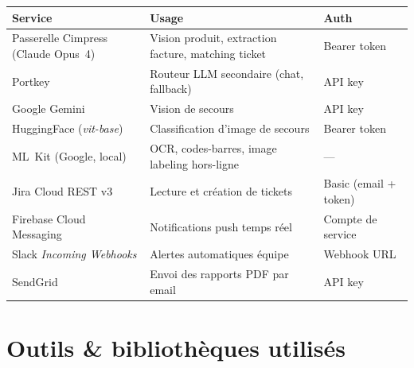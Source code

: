\documentclass[11pt,a4paper]{article}
\begin{document}
\begin{center}
\begin{tabularx}{\linewidth}{@{}lXl@{}}
\toprule
\textbf{Service} & \textbf{Usage} & \textbf{Auth}\\
\midrule
Passerelle Cimpress (Claude Opus~4) & Vision produit, extraction facture, matching ticket & Bearer token \\
Portkey                             & Routeur LLM secondaire (chat, fallback) & API key \\
Google Gemini                       & Vision de secours & API key \\
HuggingFace (\emph{vit-base})       & Classification d'image de secours & Bearer token \\
ML~Kit (Google, local)              & OCR, codes-barres, image labeling hors-ligne & --- \\
Jira Cloud REST v3                  & Lecture et création de tickets & Basic (email + token) \\
Firebase Cloud Messaging            & Notifications push temps réel & Compte de service \\
Slack \emph{Incoming Webhooks}      & Alertes automatiques équipe & Webhook URL \\
SendGrid                            & Envoi des rapports PDF par email & API key \\
\bottomrule
\end{tabularx}
\end{center}

\section{Outils \& bibliothèques utilisés}
\end{document}
